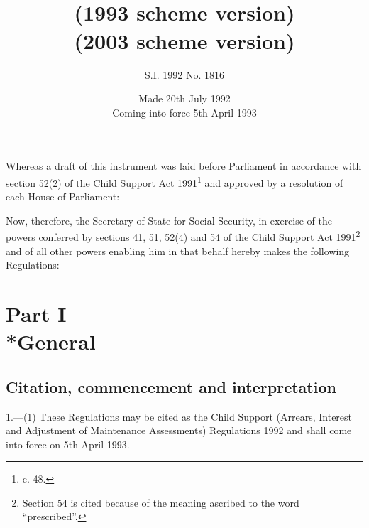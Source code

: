 \documentclass[12pt,a4paper]{article}
\title{\regstitle\\(1993 scheme version)}
\title{\regstitle\\(2003 scheme version)}
\author{S.I. 1992 No. 1816}
\date{Made 20th July 1992\\Coming into force 5th April 1993}
\begin{document}
\maketitle

\noindent
 Whereas a draft of this instrument was laid before Parliament in accordance with section 52(2) of the Child Support Act 1991\footnote{ c. 48.} and approved by a resolution of each House of Parliament:

Now, therefore, the Secretary of State for Social Security, in exercise of the powers conferred by sections 41, 51, 52(4) and 54 of the Child Support Act 1991\footnote{\frenchspacing Section 54 is cited because of the meaning ascribed to the word “prescribed”.} and of all other powers enabling him in that behalf hereby makes the following Regulations: 

{\sloppy

\tableofcontents

}

\setcounter{secnumdepth}{-2}

\section[Part I --- General]{Part I\\*General}

\renewcommand\parthead{--- Part I}

\subsection[1. Citation, commencement and interpretation]{Citation, commencement and interpretation}

1.—(1) These Regulations may be cited as the Child Support (Arrears, Interest and Adjustment of Maintenance Assessments) Regulations 1992 and shall come into force on 5th April 1993.
\end{document}
